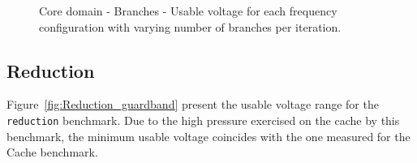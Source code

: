 
\begin{figure}[!htb]
    \centering
    \begin{subfigmatrix}{2}
      \label{fig:Branches_guardband}
    \end{subfigmatrix}
    \caption{Core domain - Branches - Usable voltage for each frequency configuration with varying number of branches per iteration.}
\end{figure}

\subsection{Reduction}

Figure~\ref{fig:Reduction_guardband} present the usable voltage range for the \texttt{reduction} benchmark. Due to the high pressure exercised on the cache by this benchmark, the minimum usable voltage coincides with the one measured for the Cache benchmark.

